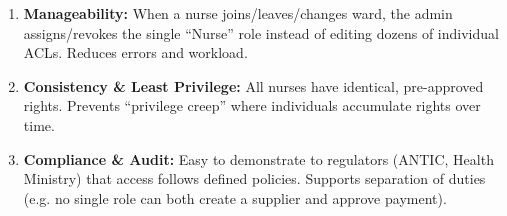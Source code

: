\documentclass[11pt]{article}
\begin{document}
\begin{corrige}
\begin{enumerate}
\begin{enumerate}
\item \textbf{Manageability:} When a nurse joins/leaves/changes ward, the admin assigns/revokes the single ``Nurse'' role instead of editing dozens of individual ACLs. Reduces errors and workload.
\item \textbf{Consistency \& Least Privilege:} All nurses have identical, pre-approved rights. Prevents ``privilege creep'' where individuals accumulate rights over time.
\item \textbf{Compliance \& Audit:} Easy to demonstrate to regulators (ANTIC, Health Ministry) that access follows defined policies. Supports separation of duties (e.g. no single role can both create a supplier and approve payment).
\end{enumerate}
\end{enumerate}
\end{corrige}
\end{document}
